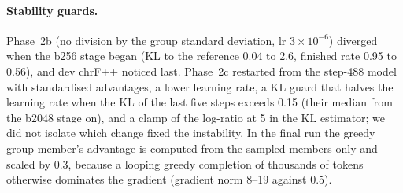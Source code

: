 \paragraph{Stability guards.} Phase~2b (no division by the group standard deviation, lr $3\times10^{-6}$) diverged when the b256 stage began (KL to the reference 0.04 to 2.6, finished rate 0.95 to 0.56), and dev chrF++ noticed last. Phase~2c restarted from the step-488 model with standardised advantages, a lower learning rate, a KL guard that halves the learning rate when the KL of the last five steps exceeds 0.15 (their median from the b2048 stage on), and a clamp of the log-ratio at 5 in the KL estimator; we did not isolate which change fixed the instability. In the final run the greedy group member's advantage is computed from the sampled members only and scaled by 0.3, because a looping greedy completion of thousands of tokens otherwise dominates the gradient (gradient norm 8--19 against 0.5).
